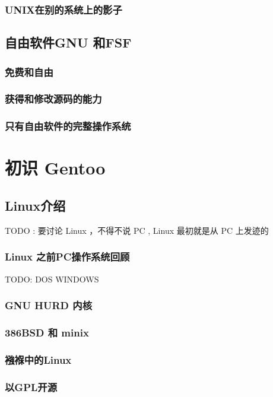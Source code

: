 \documentclass[amstex]{ctexbook}
\begin{document}
\subsection{UNIX在别的系统上的影子}

\section{自由软件GNU 和FSF}
\subsection{免费和自由}
\subsection{获得和修改源码的能力}
\subsection{只有自由软件的完整操作系统}

\chapter{初识 Gentoo}



\section{Linux介绍}

TODO :  要讨论 Linux ，不得不说 PC , Linux 最初就是从 PC 上发迹的

\subsection{Linux 之前PC操作系统回顾}

TODO:  DOS WINDOWS
\subsection{GNU HURD 内核}

 
\subsection{386BSD 和 minix}



\subsection{襁褓中的Linux}
\subsection{以GPL开源}
\end{document}
